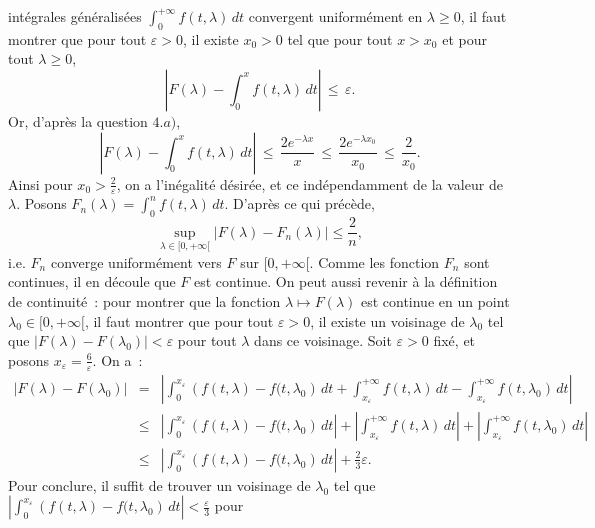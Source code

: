 {\begin{enumerate}
{int\'egrales g\'en\'eralis\'ees $\int_{0}^{+\infty} f(t,
\lambda)\,dt$ convergent uniform\'ement en $\lambda\geq 0$, il
faut montrer que pour tout $\varepsilon> 0$, il existe $x_{0}>0$
tel que pour tout $x> x_{0}$ et pour tout $\lambda\geq 0$,
\begin{equation*}
\left|F(\lambda) - \int_{0}^{x} f(t, \lambda)\,dt \right| \,\leq\,
\varepsilon.
\end{equation*}
Or, d'apr\`es la question $4.a)$,
\begin{equation*}
\left|F(\lambda) - \int_{0}^{x} f(t, \lambda)\,dt \right| \,\leq\,
\frac{2 e^{-\lambda x}}{x} \,\leq\, \frac{2 e^{-\lambda
x_{0}}}{x_{0}} \,\leq\, \frac{2}{x_{0}}.
\end{equation*}
Ainsi pour $x_{0} > \frac{2}{\varepsilon}$, on a l'in\'egalit\'e
d\'esir\'ee, et ce ind\'ependamment de la valeur de $\lambda$.
Posons $F_{n}(\lambda) = \int_{0}^{n}f(t, \lambda) \,dt$.
D'apr\`es ce qui pr\'ec\`ede,
$$
\sup_{\lambda\in [0,+\infty[} |F(\lambda) - F_{n}(\lambda)| \leq
\frac{2}{n},
$$
i.e. $F_{n}$ converge uniform\'ement vers $F$ sur $[0, +\infty[$.
Comme les fonction $F_{n}$ sont continues, il en d\'ecoule que $F$
est continue. On peut aussi revenir \`a la d\'efinition de
continuit\'e~:
 pour montrer que la fonction $\lambda \mapsto F(\lambda)$
est continue en un point $\lambda_{0} \in [0, +\infty[$, il faut
montrer que pour tout $\varepsilon>0$, il existe un voisinage de
${\lambda}_{0}$ tel que $|F(\lambda) - F({\lambda}_{0})| <
\varepsilon$ pour tout $\lambda $ dans ce voisinage. Soit
$\varepsilon>0$ fix\'e, et posons $x_{\varepsilon} =
\frac{6}{\varepsilon}$. On a~:
\begin{eqnarray*}
|F(\lambda) - F({\lambda}_{0})| &=&
\left|\int_{0}^{x_{\varepsilon}} \left(f(t, \lambda) - f(t,
{\lambda}_{0}\right)\,dt + \int_{x_{\varepsilon}}^{+\infty} f(t,
\lambda)\, dt - \int_{x_{\varepsilon}}^{+\infty} f(t,
{\lambda}_{0})\,dt
\right|\\
&\leq & \left|\int_{0}^{x_{\varepsilon}} \left(f(t, \lambda) -
f(t, {\lambda}_{0}\right)\,dt\right| + \left|
\int_{x_{\varepsilon}}^{+\infty} f(t, \lambda)\, dt \right| +
\left| \int_{x_{\varepsilon}}^{+\infty} f(t,
{\lambda}_{0})\,dt \right|\\
& \leq & \left|\int_{0}^{x_{\varepsilon}} \left(f(t, \lambda) -
f(t, {\lambda}_{0}\right)\,dt \right|+ \frac{2}{3}\varepsilon.
\end{eqnarray*}
Pour conclure, il suffit de trouver un voisinage de ${\lambda}_0$
tel que  $\left|\int_{0}^{x_{\varepsilon}} \left(f(t, \lambda) -
f(t, {\lambda}_{0}\right)\,dt\right| < \frac{\varepsilon}{3}$ pour
}
\end{enumerate}}
